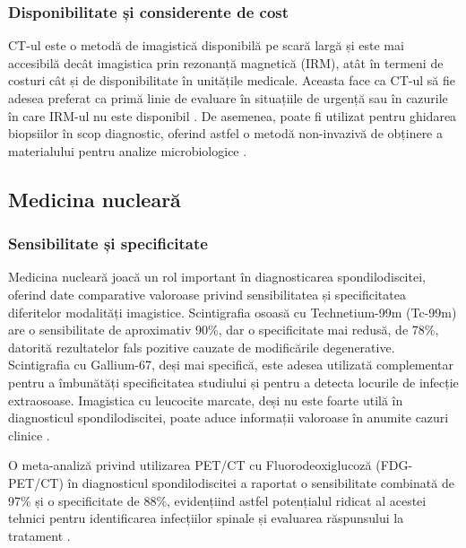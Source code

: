 \documentclass[romanian,12pt,a4paper]{article}
\begin{document}
\subsubsection{Disponibilitate și considerente de cost}

CT-ul este o metodă de imagistică disponibilă pe scară largă și este mai
accesibilă decât imagistica prin rezonanță magnetică (IRM), atât în
termeni de costuri cât și de disponibilitate în unitățile medicale.
Aceasta face ca CT-ul să fie adesea preferat ca primă linie de evaluare
în situațiile de urgență sau în cazurile în care IRM-ul nu este
disponibil \cite{ImagingCharacteristicsCT2022}. De asemenea, poate fi
utilizat pentru ghidarea biopsiilor în scop diagnostic, oferind astfel o
metodă non-invazivă de obținere a materialului pentru analize
microbiologice
\cite{ImagingCharacteristicsCT2022}\cite{ImagingAssessmentSpine2024}.

\subsection{Medicina nucleară}

\subsubsection{Sensibilitate și specificitate}

Medicina nucleară joacă un rol important în diagnosticarea
spondilodiscitei, oferind date comparative valoroase privind
sensibilitatea și specificitatea diferitelor modalități imagistice.
Scintigrafia osoasă cu Technetium-99m (Tc-99m) are o sensibilitate de
aproximativ 90\%, dar o specificitate mai redusă, de 78\%, datorită
rezultatelor fals pozitive cauzate de modificările degenerative.
Scintigrafia cu Gallium-67, deși mai specifică, este adesea utilizată
complementar pentru a îmbunătăți specificitatea studiului și pentru a
detecta locurile de infecție extraosoase. Imagistica cu leucocite
marcate, deși nu este foarte utilă în diagnosticul spondilodiscitei,
poate aduce informații valoroase în anumite cazuri clinice
\cite{RadionuclideImagingMusculoskeletal2016}\cite{RoleNuclearMedicine2012}\cite{ImagingAssessmentSpine2024}
.

O meta-analiză privind utilizarea PET/CT cu Fluorodeoxiglucoză
(FDG-PET/CT) în diagnosticul spondilodiscitei a raportat o sensibilitate
combinată de 97\% și o specificitate de 88\%, evidențiind astfel
potențialul ridicat al acestei tehnici pentru identificarea infecțiilor
spinale și evaluarea răspunsului la tratament
\cite{ImagingAssessmentSpine2024}.
\end{document}
